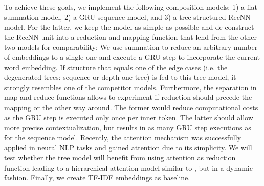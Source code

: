 To achieve these goals, we implement the following composition models: 1) a flat summation model, 2) a \ac{GRU} \autocite{cho_properties_2014} sequence model, and 3) a tree structured \ac{RecNN} model. For the latter, we keep the model as simple as possible and de-construct %
the \ac{RecNN} unit into a reduction and mapping function that lend from the other two models for comparability: We use summation to reduce an arbitrary number of embeddings to a single one and execute a \ac{GRU} step to incorporate the current word embedding. If structure that equals one of the edge cases (i.e. the degenerated trees: sequence or depth one tree) is fed to this tree model, it strongly resembles one of the competitor models. Furthermore, the separation in map and reduce functions allows to experiment if reduction should precede the mapping or the other way around. The former would reduce computational costs as the \ac{GRU} step is executed only once per inner token. The latter should allow more precise contextualization, but results in as many \ac{GRU} step executions as for the sequence model. Recently, the attention mechanism \autocite{bahdanau_neural_2014,xu_show_2015} was successfully applied in neural \ac{NLP} tasks \autocite{zhuang_neobility_2017,vaswani_attention_2017} and gained attention due to its simplicity. We will test whether the tree model will benefit from using attention as reduction function leading to a hierarchical attention model similar to \textcite{yang_hierarchical_2016}, but in a dynamic fashion. %
Finally, we create \ac{TF-IDF} embeddings as baseline. 

